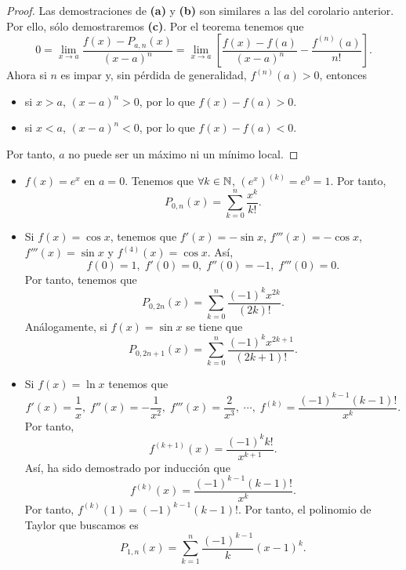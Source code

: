 \begin{proof}
Las demostraciones de \textbf{(a)} y \textbf{(b)} son similares a las del corolario anterior. Por ello, sólo demostraremos \textbf{(c)}. Por el teorema tenemos que 
\[0 = \lim_{x \to a}\frac{f\left(x\right)-P_{a,n}\left(x\right)}{\left(x-a\right)^{n}} = \lim_{x \to a}\left[\frac{f\left(x\right)-f\left(a\right)}{\left(x-a\right)^{n}}-\frac{f^{\left(n\right)}\left(a\right)}{n!}\right]  .\]
Ahora si $\displaystyle n $ es impar y, sin pérdida de generalidad, $\displaystyle f^{\left(n\right)}\left(a\right) > 0 $, entonces
\begin{itemize}
\item si $\displaystyle x > a $, $\displaystyle \left(x-a\right)^{n} > 0 $, por lo que $\displaystyle f\left(x\right)-f\left(a\right) > 0 $.
\item si $\displaystyle x < a $, $\displaystyle \left(x-a\right)^{n} < 0 $, por lo que $\displaystyle f\left(x\right)-f\left(a\right) < 0 $.
\end{itemize}
Por tanto, $\displaystyle a $ no puede ser un máximo ni un mínimo local.
\end{proof}
\begin{eg}
\normalfont 
\begin{itemize}
\item $\displaystyle f\left(x\right) = e^{x} $ en $\displaystyle a = 0 $. Tenemos que $\displaystyle \forall k \in \mathbb{N} $, $\displaystyle \left(e^{x}\right)^{\left(k\right)} = e^{0} = 1 $. Por tanto,
	\[P_{0,n}\left(x\right) =\sum^{n}_{k=0}\frac{x^{k}}{k!} .\]
\item Si $\displaystyle f\left(x\right) = \cos x $, tenemos que $\displaystyle f'\left(x\right) = -\sin x $, $\displaystyle f'''\left(x\right)=-\cos x $, $\displaystyle f'''\left(x\right) = \sin x $ y $\displaystyle f^{\left(4\right)}\left(x\right) = \cos x $. Así,
	\[f\left(0\right) = 1, \; f'\left(0\right) = 0, \; f''\left(0\right) = -1, \; f'''\left(0\right) = 0 .\]
Por tanto, tenemos que
\[P_{0,2n}\left(x\right) = \sum^{n}_{k=0}\frac{\left(-1\right)^{k}x^{2k}}{\left(2k\right)!} .\]
Análogamente, si $\displaystyle f\left(x\right) = \sin x $ se tiene que 
\[P_{0,2n +1}\left(x\right) = \sum^{n}_{k=0}\frac{\left(-1\right)^{k}x^{2k+1}}{\left(2k+1\right)!} .\]
\item Si $\displaystyle f\left(x\right) = \ln x $ tenemos que
	\[f'\left(x\right) = \frac{1}{x}, \; f''\left(x\right) = -\frac{1}{x^{2}}, \; f'''\left(x\right) = \frac{2}{x^{3}}, \; \cdots, \; f^{\left(k\right)}=\frac{\left(-1\right)^{k-1}\left(k-1\right)!}{x^{k}} .\]
Por tanto,
\[f^{\left(k+1\right)}\left(x\right) = \frac{\left(-1\right)^{k}k!}{x^{k+1}} .\]
Así, ha sido demostrado por inducción que 
\[f^{\left(k\right)}\left(x\right) = \frac{\left(-1\right)^{k-1}\left(k-1\right)!}{x^{k}} .\]
Por tanto, $\displaystyle f^{\left(k\right)}\left(1\right) = \left(-1\right)^{k-1}\left(k-1\right)! $. Por tanto, el polinomio de Taylor que buscamos es
\[P_{1,n}\left(x\right) = \sum^{n}_{k=1}\frac{\left(-1\right)^{k-1}}{k}\left(x-1\right)^{k} .\]
\end{itemize}
\end{eg}
